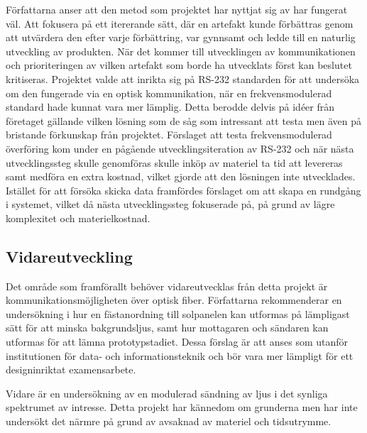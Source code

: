         Författarna anser att den metod som projektet har nyttjat sig av har fungerat väl. Att fokusera på ett itererande sätt, där en artefakt kunde förbättras genom att utvärdera den efter varje förbättring, var gynnsamt och ledde till en naturlig utveckling av produkten. När det kommer till utvecklingen av kommunikationen och prioriteringen av vilken artefakt som borde ha utvecklats först kan beslutet kritiseras. Projektet valde att inrikta sig på RS-232 standarden för att undersöka om den fungerade via en optisk kommunikation, när en frekvensmodulerad standard hade kunnat vara mer lämplig. Detta berodde delvis på idéer från företaget gällande vilken lösning som de såg som intressant att testa men även på bristande förkunskap från projektet. Förslaget att testa frekvensmodulerad överföring kom under en pågående utvecklingsiteration av RS-232 och när nästa utvecklingssteg skulle genomföras skulle inköp av materiel ta tid att levereras samt medföra en extra kostnad, vilket gjorde att den lösningen inte utvecklades. Istället för att försöka skicka data framfördes förslaget om att skapa en rundgång i systemet, vilket då nästa utvecklingssteg fokuserade på, på grund av lägre komplexitet och materielkostnad.

    \subsection{Vidareutveckling} %
    \label{sub:vidareutveckling}
        Det område som framförallt behöver vidareutvecklas från detta projekt är kommunikationsmöjligheten över optisk fiber. Författarna rekommenderar en undersökning i hur en fästanordning till solpanelen kan utformas på lämpligast sätt för att minska bakgrundsljus, samt hur mottagaren och sändaren kan utformas för att lämna prototypstadiet. Dessa förslag är att anses som utanför institutionen för data- och informationsteknik och bör vara mer lämpligt för ett designinriktat examensarbete. \bigskip

        Vidare är en undersökning av en modulerad sändning av ljus i det synliga spektrumet av intresse. Detta projekt har kännedom om grunderna men har inte undersökt det närmre på grund av avsaknad av materiel och tidsutrymme.
    
